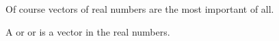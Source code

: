 

Of course vectors of real numbers are the most important of all.


A  or  or  is a vector in the real numbers.
